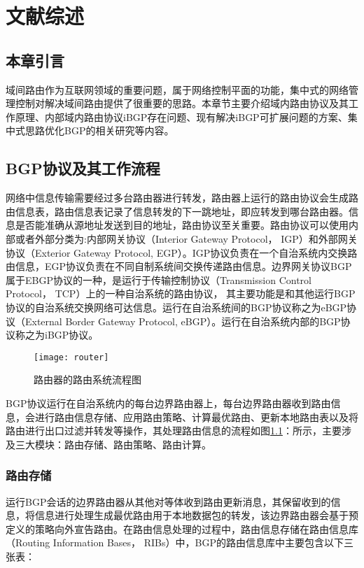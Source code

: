 \chapter{文献综述}
\label{cha:review}

\section{本章引言}
域间路由作为互联网领域的重要问题，属于网络控制平面的功能，集中式的网络管理控制对解决域间路由提供了很重要的思路。本章节主要介绍域内路由协议及其工作原理、内部域内路由协议iBGP存在问题、现有解决iBGP可扩展问题的方案、集中式思路优化BGP的相关研究等内容。

\section{BGP协议及其工作流程}

网络中信息传输需要经过多台路由器进行转发，路由器上运行的路由协议会生成路由信息表，路由信息表记录了信息转发的下一跳地址，即应转发到哪台路由器。信息是否能准确从源地址发送到目的地址，路由协议至关重要。路由协议\cite{DianeTeare2016CCNP}可以使用内部或者外部分类为:内部网关协议（Interior Gateway Protocol， IGP）和外部网关协议（Exterior Gateway Protocol, EGP）。IGP协议负责在一个自治系统内交换路由信息，EGP协议负责在不同自制系统间交换传递路由信息。边界网关协议BGP\cite{rfc1771}属于EBGP协议的一种，是运行于传输控制协议（Transmission Control Protocol， TCP）上的一种自治系统的路由协议， 其主要功能是和其他运行BGP协议的自治系统交换网络可达信息。运行在自治系统间的BGP协议称之为eBGP协议（External Border Gateway Protocol, eBGP）。运行在自治系统内部的BGP协议称之为iBGP协议。

\begin{figure}
  \centering
  \texttt{[image: router]}
  \caption{路由器的路由系统流程图\cite{journals/saem/KumarK14}}
  \label{fig:router}
\end{figure}

BGP协议运行在自治系统内的每台边界路由器上，每台边界路由器收到路由信息，会进行路由信息存储、应用路由策略、计算最优路由、更新本地路由表以及将路由进行出口过滤并转发等操作，其处理路由信息的流程如图\ref{fig:router}：所示，主要涉及三大模块：路由存储、路由策略、路由计算。

\subsection{路由存储}
运行BGP会话的边界路由器从其他对等体收到路由更新消息，其保留收到的信息，将信息进行处理生成最优路由用于本地数据包的转发，该边界路由器会基于预定义的策略向外宣告路由。在路由信息处理的过程中，路由信息存储在路由信息库（Routing Information Bases， RIBs）中，BGP的路由信息库\cite{rfc1771}中主要包含以下三张表：

